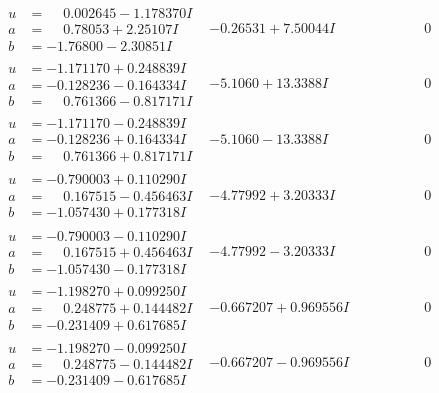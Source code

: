 \documentclass[1p]{elsarticle_modified}
\theoremstyle{definition}
\begin{document}
$$\begin{array}{c|c|c}
\begin{aligned}
u &= \phantom{-}0.002645 - 1.178370 I \\
a &= \phantom{-}0.78053 + 2.25107 I \\
b &= -1.76800 - 2.30851 I\end{aligned}
 & -0.26531 + 7.50044 I & \phantom{-0.000000 } 0 \\ \hline\begin{aligned}
u &= -1.171170 + 0.248839 I \\
a &= -0.128236 - 0.164334 I \\
b &= \phantom{-}0.761366 - 0.817171 I\end{aligned}
 & -5.1060 + 13.3388 I & \phantom{-0.000000 } 0 \\ \hline\begin{aligned}
u &= -1.171170 - 0.248839 I \\
a &= -0.128236 + 0.164334 I \\
b &= \phantom{-}0.761366 + 0.817171 I\end{aligned}
 & -5.1060 - 13.3388 I & \phantom{-0.000000 } 0 \\ \hline\begin{aligned}
u &= -0.790003 + 0.110290 I \\
a &= \phantom{-}0.167515 - 0.456463 I \\
b &= -1.057430 + 0.177318 I\end{aligned}
 & -4.77992 + 3.20333 I & \phantom{-0.000000 } 0 \\ \hline\begin{aligned}
u &= -0.790003 - 0.110290 I \\
a &= \phantom{-}0.167515 + 0.456463 I \\
b &= -1.057430 - 0.177318 I\end{aligned}
 & -4.77992 - 3.20333 I & \phantom{-0.000000 } 0 \\ \hline\begin{aligned}
u &= -1.198270 + 0.099250 I \\
a &= \phantom{-}0.248775 + 0.144482 I \\
b &= -0.231409 + 0.617685 I\end{aligned}
 & -0.667207 + 0.969556 I & \phantom{-0.000000 } 0 \\ \hline\begin{aligned}
u &= -1.198270 - 0.099250 I \\
a &= \phantom{-}0.248775 - 0.144482 I \\
b &= -0.231409 - 0.617685 I\end{aligned}
 & -0.667207 - 0.969556 I & \phantom{-0.000000 } 0 \\ \hline\begin{aligned}

\end{aligned}
\end{array}$$
\end{document}

